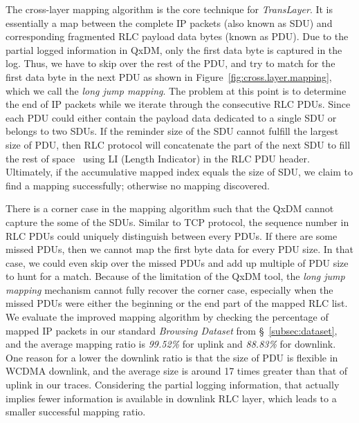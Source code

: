 The cross-layer mapping algorithm is the core technique for \textit{TransLayer}. It is essentially a map between the complete IP packets (also known as SDU) and corresponding fragmented RLC payload data bytes (known as PDU). Due to the partial logged information in QxDM, only the first data byte is captured in the log. Thus, we have to skip over the rest of the PDU, and try to match for the first data byte in the next PDU as shown in Figure~\ref{fig:cross.layer.mapping}, which we call the \textit{long jump mapping}. The problem at this point is to determine the end of IP packets while we iterate through the consecutive RLC PDUs. Since each PDU could either contain the payload data dedicated to a single SDU or belongs to two SDUs. If the reminder size of the SDU cannot fulfill the largest size of PDU, then RLC protocol will concatenate the part of the next SDU to fill the rest of space~\cite{spec-3G-RLC} using LI (Length Indicator) in the RLC PDU header. Ultimately, if the accumulative mapped index equals the size of SDU, we claim to find a mapping successfully; otherwise no mapping discovered.

There is a corner case in the mapping algorithm such that the QxDM cannot capture the some of the SDUs. Similar to TCP protocol, the sequence number in RLC PDUs could uniquely distinguish between every PDUs. If there are some missed PDUs, then we cannot map the first byte data for every PDU size. In that case, we could even skip over the missed PDUs and add up multiple of PDU size to hunt for a match. Because of the limitation of the QxDM tool, the \textit{long jump mapping} mechanism cannot fully recover the corner case, especially when the missed PDUs were either the beginning or the end part of the mapped RLC list. We evaluate the improved mapping algorithm by checking the percentage of mapped IP packets in our standard \emph{Browsing Dataset} from \S~\ref{subsec:dataset}, and the average mapping ratio is \textit{99.52\%} for uplink and \textit{88.83\%} for downlink. One reason for a lower the downlink ratio is that the size of PDU is flexible in WCDMA downlink, and the average size is around 17 times greater than that of uplink in our traces. Considering the partial logging information, that actually implies fewer information is available in downlink RLC layer, which leads to a smaller successful mapping ratio.

